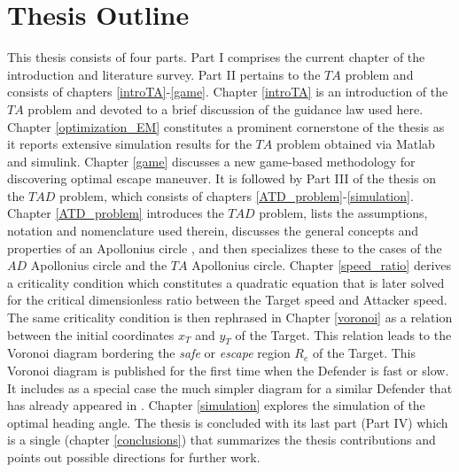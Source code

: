 \section{Thesis Outline}
This thesis consists of four parts. Part I comprises the current chapter of the introduction and literature survey. Part II pertains to the $ TA $ problem and consists of chapters \ref{introTA}-\ref{game}. Chapter \ref{introTA} is an introduction of the $ TA $ problem and  devoted to a brief discussion of the guidance law used here. Chapter \ref{optimization_EM} constitutes a prominent cornerstone of the thesis as it reports extensive simulation results for the $ TA $ problem obtained via Matlab and simulink. Chapter \ref{game} discusses a new game-based methodology for discovering optimal escape maneuver. It is followed by Part III of the thesis on the $ TAD $ problem, which consists of chapters \ref{ATD_problem}-\ref{simulation}. Chapter \ref{ATD_problem} introduces the $ TAD $ problem, lists the assumptions, notation and nomenclature used therein, discusses the general concepts and properties of an Apollonius circle \cite{ayoub2003proving,ayoub2006circle,partensky2008circle,fulton2015conflict}, and then specializes these to the cases of the $AD$ Apollonius circle and the $TA$ Apollonius circle. Chapter \ref{speed_ratio} derives a criticality condition which constitutes a quadratic equation that is later solved for the critical dimensionless ratio between the Target speed and Attacker speed. The same criticality condition is then rephrased in Chapter \ref{voronoi} as a relation between the initial coordinates $x_T$ and $y_T$ of the Target. This relation leads to the Voronoi diagram bordering the \textit{safe} or \textit{escape} region $R_e$ of the Target. This Voronoi diagram is published for the first time when the Defender is fast or slow. It includes as a special case the much simpler diagram for a similar Defender that has already appeared in \cite{garcia2015escape}. Chapter \ref{simulation} explores the simulation of the optimal heading angle. The thesis is concluded with its last part (Part IV) which is a single (chapter \ref{conclusions}) that summarizes the thesis contributions and points out possible directions for further work. 


